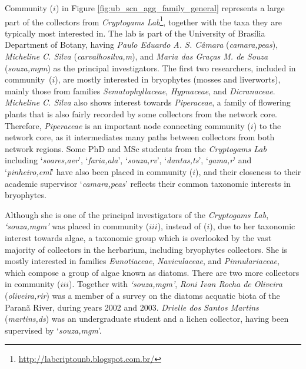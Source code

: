 Community ($i$) in Figure \ref{fig:ub_scn_agg_family_general} represents a large part of the collectors from \textit{Cryptogams Lab}\footnote{\url{http://labcriptounb.blogspot.com.br/}}, together with the taxa they are typically most interested in. 
The lab is part of the University of Brasília Department of Botany, having \textit{Paulo Eduardo A. S. Câmara} (\textit{camara,peas}), \textit{Micheline C. Silva} (\textit{carvalhosilva,m}), and \textit{Maria das Graças M. de Souza} (\textit{souza,mgm}) as the principal investigators. 
%
The first two researchers, included in community~($i$), are mostly interested in bryophytes (mosses and liverworts), mainly those from families \textit{Sematophyllaceae}, \textit{Hypnaceae}, and \textit{Dicranaceae}.
\textit{Micheline C. Silva} also shows interest towards \textit{Piperaceae}, a family of flowering plants that is also fairly recorded by some collectors from the network core. 
Therefore, \textit{Piperaceae} is an important node connecting community ($i$) to the network core, as it intermediates many paths between collectors from both network regions.
%
Some PhD and MSc students from the \textit{Cryptogams Lab} including `\textit{soares,aer}', `\textit{faria,ala}', `\textit{souza,rv}', `\textit{dantas,ts}', `\textit{gama,r}' and `\textit{pinheiro,eml}' have also been placed in community ($i$), and their closeness to their academic supervisor `\textit{camara,peas}' reflects their common taxonomic interests in bryophytes.

Although she is one of the principal investigators of the \textit{Cryptogams Lab}, \textit{`souza,mgm'} was placed in community ($iii$), instead of ($i$), due to her taxonomic interest towards algae, a taxonomic group which is overlooked by the vast majority of collectors in the herbarium, including bryophytes collectors. 
She is mostly interested in families \textit{Eunotiaceae}, \textit{Naviculaceae}, and \textit{Pinnulariaceae}, which compose a group of algae known as diatoms.
There are two more collectors in community ($iii$).
Together with \textit{`souza,mgm'}, \textit{Roni Ivan Rocha de Oliveira} (\textit{oliveira,rir}) was a member of a survey on the diatoms acquatic biota of the Paranã River, during years 2002 and 2003.
\textit{Drielle dos Santos Martins} (\textit{martins,ds}) was an undergraduate student and a lichen collector, having been supervised by `\textit{souza,mgm}'.

